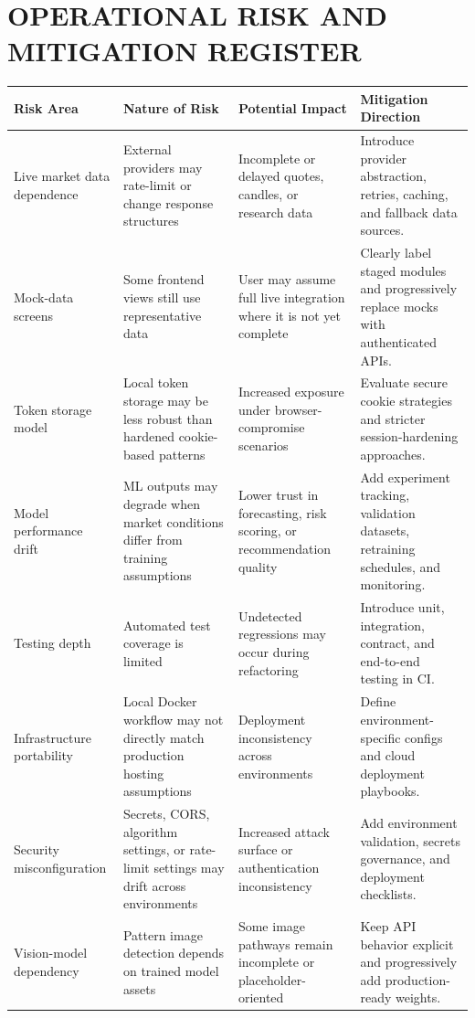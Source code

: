 \documentclass[12pt,a4paper]{report}
\begin{document}
\chapter{OPERATIONAL RISK AND MITIGATION REGISTER}
\begin{longtable}{p{} p{} p{} p{}}
\textbf{Risk Area} & \textbf{Nature of Risk} & \textbf{Potential Impact} & \textbf{Mitigation Direction} \\
\hline
Live market data dependence & External providers may rate-limit or change response structures & Incomplete or delayed quotes, candles, or research data & Introduce provider abstraction, retries, caching, and fallback data sources. \\
Mock-data screens & Some frontend views still use representative data & User may assume full live integration where it is not yet complete & Clearly label staged modules and progressively replace mocks with authenticated APIs. \\
Token storage model & Local token storage may be less robust than hardened cookie-based patterns & Increased exposure under browser-compromise scenarios & Evaluate secure cookie strategies and stricter session-hardening approaches. \\
Model performance drift & ML outputs may degrade when market conditions differ from training assumptions & Lower trust in forecasting, risk scoring, or recommendation quality & Add experiment tracking, validation datasets, retraining schedules, and monitoring. \\
Testing depth & Automated test coverage is limited & Undetected regressions may occur during refactoring & Introduce unit, integration, contract, and end-to-end testing in CI. \\
Infrastructure portability & Local Docker workflow may not directly match production hosting assumptions & Deployment inconsistency across environments & Define environment-specific configs and cloud deployment playbooks. \\
Security misconfiguration & Secrets, CORS, algorithm settings, or rate-limit settings may drift across environments & Increased attack surface or authentication inconsistency & Add environment validation, secrets governance, and deployment checklists. \\
Vision-model dependency & Pattern image detection depends on trained model assets & Some image pathways remain incomplete or placeholder-oriented & Keep API behavior explicit and progressively add production-ready weights. \\
\end{longtable}
\end{document}
